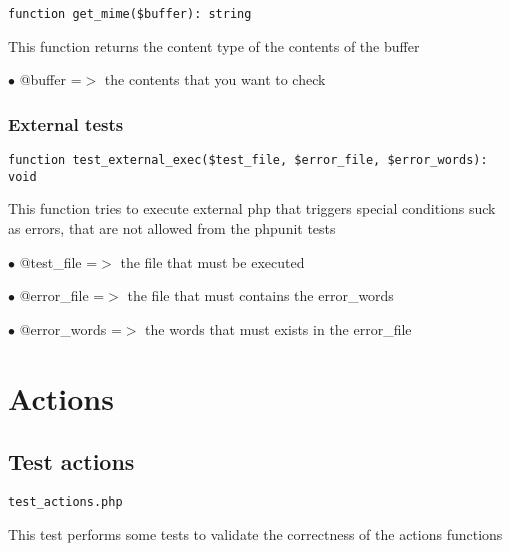 \documentclass[a4paper]{article}
\begin{document}
\begin{lstlisting}
function get_mime($buffer): string
\end{lstlisting}

This function returns the content type of the contents of the buffer

\begin{compactitem}
\item[\color{myblue}$\bullet$] @buffer =$>$ the contents that you want to check
\end{compactitem}

\hypertarget{toc11}{}
\subsubsection{External tests}

\begin{lstlisting}
function test_external_exec($test_file, $error_file, $error_words): void
\end{lstlisting}

This function tries to execute external php that triggers special conditions
suck as errors, that are not allowed from the phpunit tests

\begin{compactitem}
\item[\color{myblue}$\bullet$] @test\_file   =$>$ the file that must be executed
\item[\color{myblue}$\bullet$] @error\_file  =$>$ the file that must contains the error\_words
\item[\color{myblue}$\bullet$] @error\_words =$>$ the words that must exists in the error\_file
\end{compactitem}


\hypertarget{toc12}{}
\section{Actions}

\hypertarget{toc13}{}
\subsection{Test actions}

\begin{lstlisting}
test_actions.php
\end{lstlisting}

This test performs some tests to validate the correctness
of the actions functions

\hypertarget{toc14}{}
\end{document}
